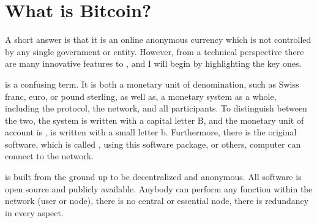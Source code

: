 
\chapter{What is Bitcoin?}

A short answer is that it is an online anonymous currency which is
not controlled by any single government or entity. However, from a
technical perspective there are many innovative features to ,
and I will begin by highlighting the key ones. 

is a confusing term. It is both a monetary
unit of denomination, such as Swiss franc, euro, or pound sterling,
as well as, a monetary system as a whole, including the protocol,
the network, and all participants. To distinguish between the two,
the system  is written with a capital letter
B, and the monetary unit of account is ,
is written with a small letter b. Furthermore, there is the original
 software, which is called\textbf{ },
using this software package, or others, computer can connect to the
 network.

is built from the ground up to be decentralized
and anonymous. All software is open source and publicly available.
Anybody can perform any function within the network (user or node),
there is no central or essential node, there is redundancy in every
aspect.
